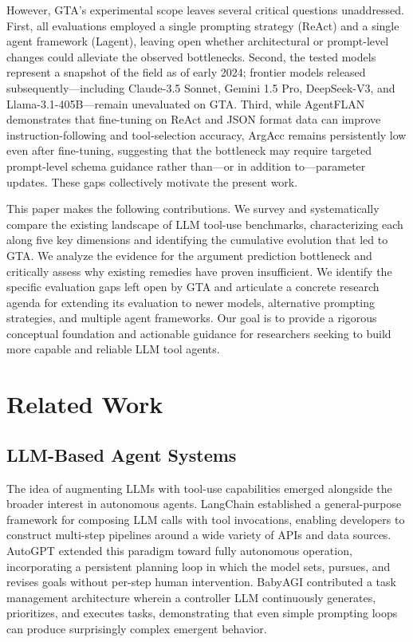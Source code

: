 \documentclass[conference]{IEEEtran}
\begin{document}
However, GTA's experimental scope leaves several critical questions unaddressed. First, all evaluations employed a single prompting strategy (ReAct) and a single agent framework (Lagent), leaving open whether architectural or prompt-level changes could alleviate the observed bottlenecks. Second, the tested models represent a snapshot of the field as of early 2024; frontier models released subsequently---including Claude-3.5 Sonnet, Gemini 1.5 Pro, DeepSeek-V3, and Llama-3.1-405B---remain unevaluated on GTA. Third, while AgentFLAN \cite{chen2024agentflan} demonstrates that fine-tuning on ReAct and JSON format data can improve instruction-following and tool-selection accuracy, ArgAcc remains persistently low even after fine-tuning, suggesting that the bottleneck may require targeted prompt-level schema guidance rather than---or in addition to---parameter updates. These gaps collectively motivate the present work.

This paper makes the following contributions. We survey and systematically compare the existing landscape of LLM tool-use benchmarks, characterizing each along five key dimensions and identifying the cumulative evolution that led to GTA. We analyze the evidence for the argument prediction bottleneck and critically assess why existing remedies have proven insufficient. We identify the specific evaluation gaps left open by GTA and articulate a concrete research agenda for extending its evaluation to newer models, alternative prompting strategies, and multiple agent frameworks. Our goal is to provide a rigorous conceptual foundation and actionable guidance for researchers seeking to build more capable and reliable LLM tool agents.

\section{Related Work}

\subsection{LLM-Based Agent Systems}

The idea of augmenting LLMs with tool-use capabilities emerged alongside the broader interest in autonomous agents. LangChain \cite{chase2022langchain} established a general-purpose framework for composing LLM calls with tool invocations, enabling developers to construct multi-step pipelines around a wide variety of APIs and data sources. AutoGPT \cite{gravitas2023autogpt} extended this paradigm toward fully autonomous operation, incorporating a persistent planning loop in which the model sets, pursues, and revises goals without per-step human intervention. BabyAGI \cite{nakajima2023babyagi} contributed a task management architecture wherein a controller LLM continuously generates, prioritizes, and executes tasks, demonstrating that even simple prompting loops can produce surprisingly complex emergent behavior.
\end{document}
